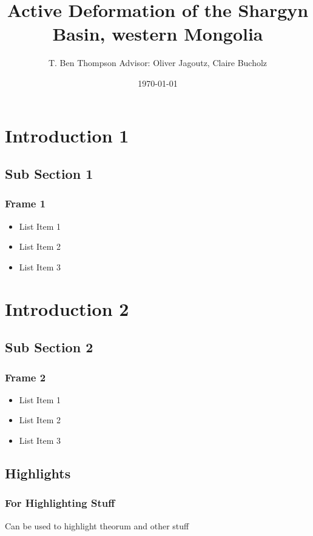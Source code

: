 \documentclass{beamer}
\title{Active Deformation of the Shargyn Basin, western Mongolia}
\author{T. Ben Thompson
	Advisor: Oliver Jagoutz, Claire Bucholz}
\date{\today}
\begin{document}
\frame{\titlepage}

\section[Outline]{}
\frame{\tableofcontents}

\section{Introduction 1}
\subsection{Sub Section 1}
\frame
{
\frametitle{Frame 1}

\begin{itemize}
\item<1-> List Item 1
\item<2-> List Item 2
\item<3-> List Item 3
\end{itemize}
}
\section{Introduction 2}
\subsection{Sub Section 2}
\frame
{
\frametitle{Frame 2}

\begin{itemize}
\item<1-> List Item 1
\item<2-> List Item 2
\item<3-> List Item 3
\end{itemize}
}
\subsection{Highlights}
\frame
{
\frametitle{For Highlighting Stuff}
\begin{theorem}
Can be used to highlight theorum and other stuff
\end{theorem}
}
\end{document}
